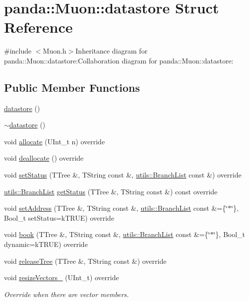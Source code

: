 \hypertarget{structpanda_1_1Muon_1_1datastore}{
\section{panda::Muon::datastore Struct Reference}
\label{structpanda_1_1Muon_1_1datastore}
}


{\ttfamily \#include $<$Muon.h$>$}Inheritance diagram for panda::Muon::datastore:Collaboration diagram for panda::Muon::datastore:\subsection*{Public Member Functions}
\begin{DoxyCompactItemize}
\item 
\hyperlink{structpanda_1_1Muon_1_1datastore_a85904b7d723e3e95abf0901bbf3db103}{datastore} ()
\item 
\hyperlink{structpanda_1_1Muon_1_1datastore_a399cd7ed5610fc6c99ac1d3365ddc354}{$\sim$datastore} ()
\item 
void \hyperlink{structpanda_1_1Muon_1_1datastore_a6845ee992e7f6f23a4f159b97411bfc6}{allocate} (UInt\_\-t n) override
\item 
void \hyperlink{structpanda_1_1Muon_1_1datastore_aed9de75b6fb1e71671aa8a5b00862ace}{deallocate} () override
\item 
void \hyperlink{structpanda_1_1Muon_1_1datastore_a930f982ca62e2c7ceeb62dfcd5e03db9}{setStatus} (TTree \&, TString const \&, \hyperlink{classpanda_1_1utils_1_1BranchList}{utils::BranchList} const \&) override
\item 
\hyperlink{classpanda_1_1utils_1_1BranchList}{utils::BranchList} \hyperlink{structpanda_1_1Muon_1_1datastore_aa1c3edc46b6ca55e9b77634cdd0e6684}{getStatus} (TTree \&, TString const \&) const override
\item 
void \hyperlink{structpanda_1_1Muon_1_1datastore_a04e66e2ffe68566cbba217d5682c8288}{setAddress} (TTree \&, TString const \&, \hyperlink{classpanda_1_1utils_1_1BranchList}{utils::BranchList} const \&=\{\char`\"{}$\ast$\char`\"{}\}, Bool\_\-t setStatus=kTRUE) override
\item 
void \hyperlink{structpanda_1_1Muon_1_1datastore_ae3244041804870c1792c7ad3cd96ee53}{book} (TTree \&, TString const \&, \hyperlink{classpanda_1_1utils_1_1BranchList}{utils::BranchList} const \&=\{\char`\"{}$\ast$\char`\"{}\}, Bool\_\-t dynamic=kTRUE) override
\item 
void \hyperlink{structpanda_1_1Muon_1_1datastore_ac48b5f3d5fb73f9e54f0f810d11f8010}{releaseTree} (TTree \&, TString const \&) override
\item 
void \hyperlink{structpanda_1_1Muon_1_1datastore_a77544efc70e6058bc86a09dc6a13f483}{resizeVectors\_\-} (UInt\_\-t) override
\begin{DoxyCompactList}\small\item\em Override when there are vector members. \item\end{DoxyCompactList}\end{DoxyCompactItemize}


